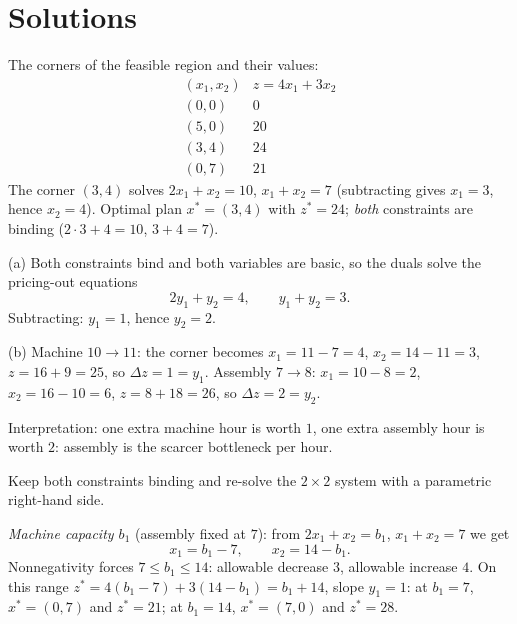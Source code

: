 \section{Solutions}

\begin{solutions}
  \item The corners of the feasible region and their values:
        \[
          \begin{array}{c|c}
            (x_{1},x_{2}) & z=4x_{1}+3x_{2}\\\hline
            (0,0) & 0\\
            (5,0) & 20\\
            (3,4) & 24\\
            (0,7) & 21
          \end{array}
        \]
        The corner $(3,4)$ solves $2x_{1}+x_{2}=10$, $x_{1}+x_{2}=7$
        (subtracting gives $x_{1}=3$, hence $x_{2}=4$). Optimal plan
        $x^{*}=(3,4)$ with $z^{*}=24$; \emph{both} constraints are
        binding ($2\cdot 3+4=10$, $3+4=7$).

  \item (a) Both constraints bind and both variables are basic, so the
        duals solve the pricing-out equations
        \[
          2y_{1}+y_{2}=4,\qquad y_{1}+y_{2}=3 .
        \]
        Subtracting: $y_{1}=1$, hence $y_{2}=2$.

        (b) Machine $10\to 11$: the corner becomes $x_{1}=11-7=4$,
        $x_{2}=14-11=3$, $z=16+9=25$, so $\Delta z=1=y_{1}$. Assembly
        $7\to 8$: $x_{1}=10-8=2$, $x_{2}=16-10=6$, $z=8+18=26$, so
        $\Delta z=2=y_{2}$.

        Interpretation: one extra machine hour is worth $1$, one extra
        assembly hour is worth $2$: assembly is the scarcer bottleneck
        per hour.

  \item Keep both constraints binding and re-solve the $2\times2$ system
        with a parametric right-hand side.

        \emph{Machine capacity $b_{1}$} (assembly fixed at $7$): from
        $2x_{1}+x_{2}=b_{1}$, $x_{1}+x_{2}=7$ we get
        \[
          x_{1}=b_{1}-7,\qquad x_{2}=14-b_{1}.
        \]
        Nonnegativity forces $7\le b_{1}\le 14$: allowable decrease $3$,
        allowable increase $4$. On this range
        $z^{*}=4(b_{1}-7)+3(14-b_{1})=b_{1}+14$, slope $y_{1}=1$: at
        $b_{1}=7$, $x^{*}=(0,7)$ and $z^{*}=21$; at $b_{1}=14$,
        $x^{*}=(7,0)$ and $z^{*}=28$.


\end{solutions}
